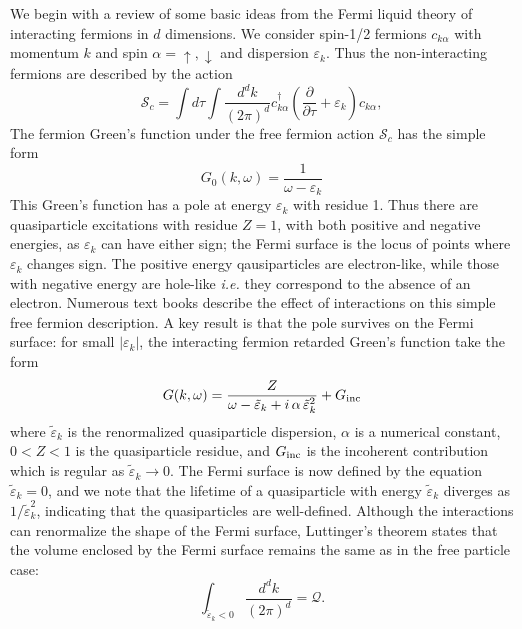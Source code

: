 \documentclass[10pt, oneside]{book}
\def\beq{\begin{equation}}
\def\eeq{\end{equation}}
\begin{document}
\begin{doublespace}
We begin with a review of some basic ideas from 
the Fermi liquid theory of interacting fermions in $d$ dimensions.
We consider spin-1/2 fermions $c_{k \alpha}$ with momentum $k$ and spin
$\alpha = \uparrow, \downarrow$ and dispersion $\varepsilon_k$. Thus the non-interacting
fermions are described by the action
\begin{equation}
\mathcal{S}_c = \int d\tau \int \frac{d^d k}{( 2\pi)^d} c_{k\alpha}^\dagger \left( \frac{\partial}{\partial \tau} + \varepsilon_k
\right) c_{k \alpha}, \label{sc}
\end{equation}
The fermion Green's function under the free fermion action $\mathcal{S}_c$ has the simple form
\begin{equation}
G_0 (k, \omega ) = \frac{1}{\omega - \varepsilon_k}
\label{flt1}
\end{equation}
This Green's function has a pole
at energy $\varepsilon_k$ with residue 1. Thus there are quasiparticle excitations with residue $Z=1$,
with both positive
and negative energies, as $\varepsilon_k$ can have either sign; the Fermi surface is the locus of points
where $\varepsilon_k$ changes sign.
The positive energy qausiparticles
are electron-like, while those with negative energy are hole-like {\em i.e.\/} they correspond to the absence
of an electron. Numerous text books describe the effect of interactions on this simple free fermion description.
A key result is that the pole survives on the Fermi surface: for small $|\varepsilon_k|$, the interacting 
fermion retarded Green's function take the form
\beq
G(k, \omega) = \frac{Z}{\omega - \tilde{\varepsilon}_k + i \, \alpha \, \tilde{\varepsilon}_k^2} + G_{\rm inc}
\label{Gfl}
\eeq
where $\tilde{\varepsilon}_k$ is the renormalized quasiparticle dispersion, $\alpha$ is a numerical constant, $0 < Z < 1$
is the quasiparticle residue, and $G_{\rm inc}$ is the incoherent contribution which is regular as $\tilde{\varepsilon}_k \rightarrow 0$. The Fermi surface is now defined by the equation $\tilde{\varepsilon}_k = 0$, and we note that the lifetime of a
quasiparticle with energy $\tilde{\varepsilon}_k$ diverges as $1/\tilde{\varepsilon}_k^2$, indicating that the quasiparticles
are well-defined. Although the interactions can renormalize the shape of the Fermi surface, Luttinger's theorem states that
the volume enclosed by the Fermi surface remains the same as in the free particle case:
\beq
\int_{\tilde{\varepsilon}_k < 0} \frac{d^d k}{(2 \pi)^d} = \mathcal{Q}.
\label{lutt1}
\eeq


\end{doublespace}
\end{document}
